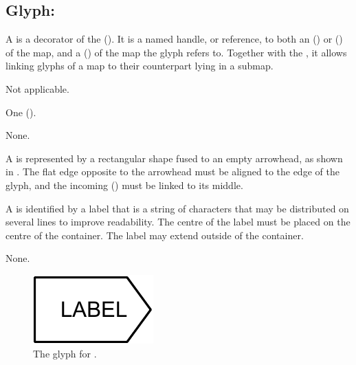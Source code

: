 \subsection{Glyph: }
\label{sec:submapTerminal}

A  is a decorator of the  ().
It is a named handle, or reference, to both an  () or  () of the map, and a  () of the map the  glyph refers to.
Together with the , it allows linking glyphs of a map to their counterpart lying in a submap.

\begin{glyphDescription}

\glyphSboTerm Not applicable.

\glyphIncoming
One  ().

\glyphOutgoing
None.

\glyphContainer A  is represented by a rectangular shape fused to an empty arrowhead, as shown in .
The flat edge opposite to the arrowhead must be aligned to the edge of the  glyph, and the incoming  () must be linked to its middle.

\glyphLabel A  is identified by a label that is  a string of characters that may be distributed on several lines to improve readability.
The centre of the label must be placed on the centre of the container.
The label may extend outside of the container.

\glyphAux
None.

\end{glyphDescription}

\begin{figure}[H]
  \centering
  \includegraphics{images/build/submap_terminal.pdf}
  \caption{The \AF glyph for .}
  \label{fig:submapTerminal}
\end{figure}